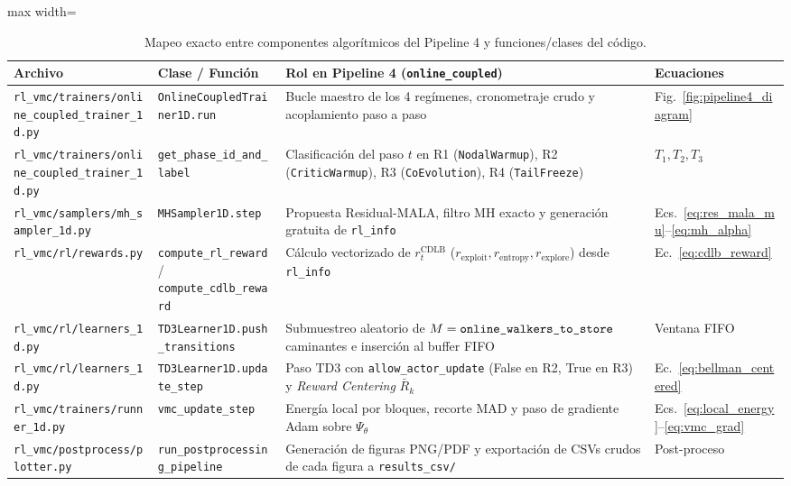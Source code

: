 \documentclass[10pt,a4paper]{article}
\begin{document}
\begin{table}[H]
\centering
\caption{Mapeo exacto entre componentes algor\'itmicos del Pipeline 4 y funciones/clases del c\'odigo.}
\label{tab:code_mapping}
\begin{adjustbox}{max width=\textwidth}
\begin{tabular}{llll}
\toprule
\textbf{Archivo} & \textbf{Clase / Funci\'on} & \textbf{Rol en Pipeline 4 (\texttt{online\_coupled})} & \textbf{Ecuaciones} \\
\midrule
\texttt{rl\_vmc/trainers/online\_coupled\_trainer\_1d.py} & \texttt{OnlineCoupledTrainer1D.run} & Bucle maestro de los 4 reg\'imenes, cronometraje crudo y acoplamiento paso a paso & Fig.\ \ref{fig:pipeline4_diagram} \\
\texttt{rl\_vmc/trainers/online\_coupled\_trainer\_1d.py} & \texttt{get\_phase\_id\_and\_label} & Clasificaci\'on del paso $t$ en R1 (\texttt{NodalWarmup}), R2 (\texttt{CriticWarmup}), R3 (\texttt{CoEvolution}), R4 (\texttt{TailFreeze}) & $T_1, T_2, T_3$ \\
\texttt{rl\_vmc/samplers/mh\_sampler\_1d.py} & \texttt{MHSampler1D.step} & Propuesta Residual-MALA, filtro MH exacto y generaci\'on gratuita de \texttt{rl\_info} & Ecs.\ \eqref{eq:res_mala_mu}--\eqref{eq:mh_alpha} \\
\texttt{rl\_vmc/rl/rewards.py} & \texttt{compute\_rl\_reward} / \texttt{compute\_cdlb\_reward} & C\'alculo vectorizado de $r_t^{\mathrm{CDLB}}$ ($r_{\mathrm{exploit}}, r_{\mathrm{entropy}}, r_{\mathrm{explore}}$) desde \texttt{rl\_info} & Ec.\ \eqref{eq:cdlb_reward} \\
\texttt{rl\_vmc/rl/learners\_1d.py} & \texttt{TD3Learner1D.push\_transitions} & Submuestreo aleatorio de $M=\text{\texttt{online\_walkers\_to\_store}}$ caminantes e inserci\'on al buffer FIFO & Ventana FIFO \\
\texttt{rl\_vmc/rl/learners\_1d.py} & \texttt{TD3Learner1D.update\_step} & Paso TD3 con \texttt{allow\_actor\_update} (False en R2, True en R3) y \textit{Reward Centering} $\bar{R}_k$ & Ec.\ \eqref{eq:bellman_centered} \\
\texttt{rl\_vmc/trainers/runner\_1d.py} & \texttt{vmc\_update\_step} & Energ\'ia local por bloques, recorte MAD y paso de gradiente Adam sobre $\Psi_\theta$ & Ecs.\ \eqref{eq:local_energy}--\eqref{eq:vmc_grad} \\
\texttt{rl\_vmc/postprocess/plotter.py} & \texttt{run\_postprocessing\_pipeline} & Generaci\'on de figuras PNG/PDF y exportaci\'on de CSVs crudos de cada figura a \texttt{results\_csv/} & Post-proceso \\
\bottomrule
\end{tabular}
\end{adjustbox}
\end{table}
\end{document}
